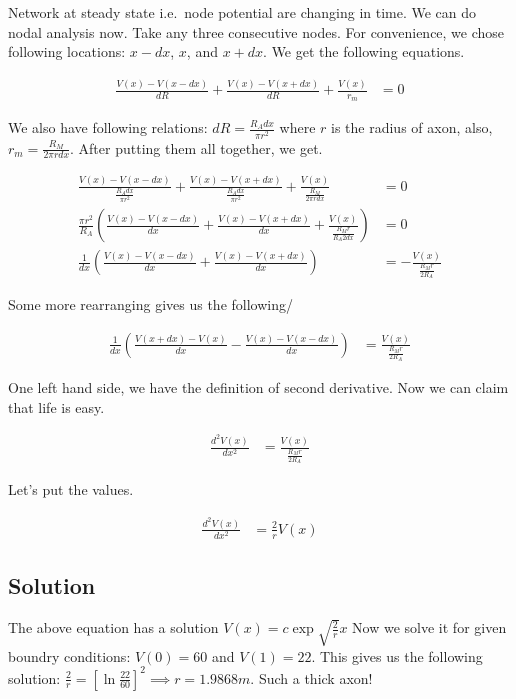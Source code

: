 \documentclass[]{article}
\begin{document}
Network at steady state i.e.~node potential are changing in time. We can
do nodal analysis now. Take any three consecutive nodes. For
convenience, we chose following locations: $x-dx$, $x$, and $x+dx$. We
get the following equations.

\begin{align}
\frac{V(x) - V(x-dx)}{dR} + \frac{V(x) - V(x+dx)}{dR} + \frac{V(x)}{r_m} &= 0
\end{align}

We also have following relations: $dR=\frac{R_A dx}{\pi r^2}$ where $r$
is the radius of axon, also, $r_m =\frac{R_M}{2\pi r dx}$. After putting
them all together, we get.

\begin{align}
\frac{V(x) - V(x-dx)}{\frac{R_A dx}{\pi r^2}} + \frac{V(x) - V(x+dx)}
    {\frac{R_A dx}{\pi r^2}} + \frac{V(x)}{\frac{R_M}{2\pi r dx}} &= 0  \\
\frac{\pi r^2}{R_A} \left( \frac{V(x) - V(x-dx)}{dx} +
    \frac{V(x) - V(x+dx)}{dx} + \frac{V(x)}{\frac{R_Mr}{R_A 2dx}} \right) &= 0 \\ 
\frac{1}{dx} \left( \frac{V(x) - V(x-dx)}{dx} + \frac{V(x) - V(x+dx)}{dx} \right)
    &= - \frac{V(x)}{\frac{R_Mr}{2R_A}} 
\end{align}

Some more rearranging gives us the following/

\begin{align}
\frac{1}{dx} \left( 
    \frac{V(x+dx) - V(x)}{dx} - \frac{V(x) - V(x-dx)}{dx} 
\right) &=  \frac{V(x)}{\frac{R_Mr}{2R_A}} 
\end{align}

One left hand side, we have the definition of second derivative. Now we
can claim that life is easy.

\begin{eqnarray}
    \label{eqn}
    \frac{d^2V(x)}{dx^2} &= \frac{V(x)}{\frac{R_Mr}{2R_A}}
\end{eqnarray}

Let's put the values.

\begin{eqnarray}
    \frac{d^2V(x)}{dx^2} &= \frac{2}{r}  V(x)
\end{eqnarray}

\subsection{Solution}\label{solution}

The above equation has a solution $V(x) = c \exp \sqrt{\frac{2}{r}}x$
Now we solve it for given boundry conditions: $V(0) = 60$ and
$V(1) = 22$. This gives us the following solution:
$\frac{2}{r}=  [\ln \frac{22}{60}]^2 \implies r = 1.9868 m$. Such a
thick axon!
\end{document}
